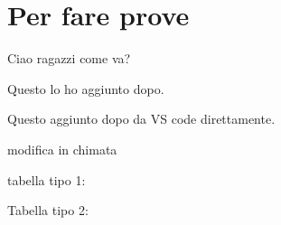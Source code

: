 \chapter{Per fare prove}

Ciao ragazzi come va?


Questo lo ho aggiunto dopo.

Questo aggiunto dopo da VS code direttamente.


modifica in chimata

tabella tipo 1:


Tabella tipo 2:
